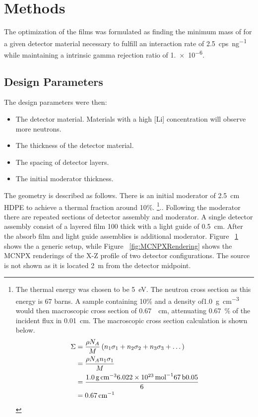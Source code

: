 \section{Methods}
\label{sec:Methodes}


The optimization of the films was formulated as finding the minimum mass of  for a given detector material necessary to fulfill an interaction rate of \SI{2.5}{cps\per\nano\gram{}} while maintaining a intrinsic gamma rejection ratio of \num{1.e-6}.

\subsection{Design Parameters}
\label{sec:DesignParameters}
The design parameters were then:
\begin{itemize}
  \item The detector material. Materials with a high [Li] concentration will observe more neutrons.
  \item The thickness of the detector material.
  \item The spacing of detector layers.
  \item The initial moderator thickness.
\end{itemize}

The geometry is described as follows.
There is an initial moderator of \SI{2.5}{\centi \meter} HDPE to achieve a thermal fraction around 10\%.
\footnote{The thermal energy was chosen to be \SI{5}{\electronvolt}. 
The  neutron cross section as this energy is 67 barns. 
A sample containing 10\%  and a density of\SI{1.0}{\gram \per \cubic \centi\meter} would then macroscopic cross section of \SI{0.67}{\per \centi\meter}, attenuating \SI{0.67}{\percent} of the incident flux in \SI{0.01}{ \centi\meter}. 
The macroscopic cross section calculation is shown below. 
\begin{align*}
\Sigma &= \frac{\rho N_A}{M}  \left ( n_1 \sigma_1 + n_2 \sigma_2 + n_3 \sigma_3 + \dots  \right ) \\ 
       &= \frac{\rho N_A n_1 \sigma_1}{M} \\
       &= \frac{\SI{1.0}{\gram\per\cubic\centi\meter} \SI{6.022E23}{\per\mole} \SI{67}{\barn}{0.05}}{6} \\
       &= \SI{0.67}{\per\centi\meter} 
\end{align*}
}..
Following the moderator there are repeated sections of detector assembly and moderator. A single detector assembly consist of a layered film \SI{100}{\micron} thick with a light guide of \SI{0.5}{\centi\meter}.
After the absorb film and light guide assemblies is additional moderator.
Figure ~\ref{fig:GenericDetector} shows the a generic setup, while Figure ~\ref{fig:MCNPXRendering} shows the MCNPX renderings of the X-Z profile of two detector configurations.
The source is not shown as it is located \SI{2}{\meter} from the detector midpoint.
\begin{figure}
   \label{fig:GenericDetector}
\end{figure}

